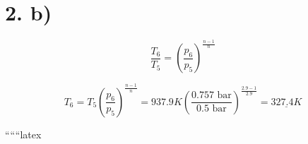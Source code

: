 \section*{2. b)}

\[
\frac{T_6}{T_5} = \left( \frac{p_6}{p_5} \right)^{\frac{n-1}{n}}
\]

\[
T_6 = T_5 \left( \frac{p_6}{p_5} \right)^{\frac{n-1}{n}} = 937.9K \left( \frac{0.757 \text{ bar}}{0.5 \text{ bar}} \right)^{\frac{2.9-1}{2.9}} = \underline{327.4K}
\]

``````latex